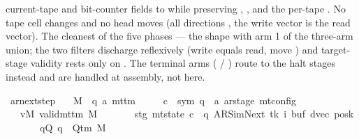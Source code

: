 \begin{isabellebody}
\begin{isamarkuptext}
  current-tape and bit-counter fields to  while preserving
  , , and the per-tape .  No tape
  cell changes and no head moves (all directions ,
  the write vector is the read vector).  The cleanest of the five
  phases — the  shape with arm 1 of the
  three-arm  union; the two 
  filters discharge reflexively (write equals read, move )
  and target-stage validity rests only on .
  The terminal arms ( / ) route
  to the halt stages instead and are handled at assembly, not here.%
\end{isamarkuptext}\isamarkuptrue%
\isamarkupfalse%
\ ar{\isacharunderscore}{\kern0pt}next{\isacharunderscore}{\kern0pt}step{\isacharcolon}{\kern0pt}\isanewline
\ \ \ M\ {\isacharcolon}{\kern0pt}{\isacharcolon}{\kern0pt}\ {\isachardoublequoteopen}{\isacharparenleft}{\kern0pt}{\isacharprime}{\kern0pt}q{\isacharcomma}{\kern0pt}\ {\isacharprime}{\kern0pt}a{\isacharparenright}{\kern0pt}\ mttm{\isachardoublequoteclose}\isanewline
\ \ \ \ \ c{\isacharprime}{\kern0pt}\ {\isacharcolon}{\kern0pt}{\isacharcolon}{\kern0pt}\ {\isachardoublequoteopen}{\isacharparenleft}{\kern0pt}sym{}{\isacharcomma}{\kern0pt}\ {\isacharprime}{\kern0pt}q\ {\isasymtimes}\ {\isacharprime}{\kern0pt}a\ ar{\isacharunderscore}{\kern0pt}stage{\isacharparenright}{\kern0pt}\ mt{\isacharunderscore}{\kern0pt}config{\isachardoublequoteclose}\isanewline
\ \ \ vM{\isacharcolon}{\kern0pt}\ {\isachardoublequoteopen}valid{\isacharunderscore}{\kern0pt}mttm\ M{\isachardoublequoteclose}\isanewline
\ \ \ \ \ \ \ stg{\isacharcolon}{\kern0pt}\ {\isachardoublequoteopen}mt{\isacharunderscore}{\kern0pt}state\ c{\isacharprime}{\kern0pt}\ {\isacharequal}{\kern0pt}\ {\isacharparenleft}{\kern0pt}q{\isacharcomma}{\kern0pt}\ AR{\isacharunderscore}{\kern0pt}SimNext{\isacharcomma}{\kern0pt}\ tk{\isacharcomma}{\kern0pt}\ i{\isacharcomma}{\kern0pt}\ buf{\isacharcomma}{\kern0pt}\ dvec{\isacharcomma}{\kern0pt}\ posk{\isacharparenright}{\kern0pt}{\isachardoublequoteclose}\isanewline
\ \ \ \ \ \ \ qQ{\isacharcolon}{\kern0pt}\ {\isachardoublequoteopen}q\ {\isasymin}\ Q{\isacharunderscore}{\kern0pt}tm\ M{\isachardoublequoteclose}\isanewline

\end{isabellebody}
